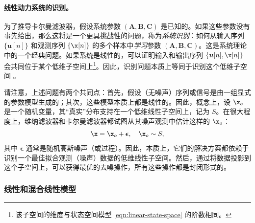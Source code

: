 \documentclass[../../book-main.tex]{subfiles}
\begin{document}
\paragraph{线性动力系统的识别。}
为了推导卡尔曼滤波器，假设系统参数 $(\boldsymbol{A}, \boldsymbol{B}, \boldsymbol{C})$ 是已知的。如果这些参数没有事先给出，那么这将是一个更具挑战性的问题，称为{\em 系统识别}：如何从输入序列 $\{\boldsymbol{u}[n]\}$ 和观测序列 $\{\x[n]\}$ 的多个样本中{\em 学习}参数 $(\boldsymbol{A}, \boldsymbol{B}, \boldsymbol{C})$。这是系统理论中的一个经典问题。如果系统是线性的，可以证明输入和输出序列 $\{\boldsymbol{u}[n], \x[n]\}$ 会共同位于某个低维子空间上\footnote{该子空间的维度与状态空间模型 \eqref{eqn:linear-state-space} 的阶数相同。}。因此，识别问题本质上等同于识别这个低维子空间 \cite{OverscheeP1996,Liu-2009-CDC,Liu-2010-SIAM}。

请注意，上述问题有两个共同点：首先，假设（无噪声）序列或信号是由一组显式的参数模型生成的；其次，这些模型本质上都是线性的。因此，概念上，设 $\x_o$ 是一个随机变量，其“真实”分布支持在一个低维线性子空间上，记为 $S$。在很大程度上，维纳滤波器和卡尔曼滤波器都试图从其噪声观测中估计这样的 $\x_o$：
\begin{equation}
    \x = \x_o + \boldsymbol{\epsilon}, \quad \x_o \sim S, 
\end{equation}
其中 $\boldsymbol{\epsilon}$ 通常是随机高斯噪声（或过程）。因此，本质上，它们的解决方案都依赖于识别一个最佳拟合观测（噪声）数据的低维线性子空间。然后，通过将数据投影到这个子空间上，可以获得最优的去噪操作，所有这些操作都是封闭形式的。


\subsubsection{线性和混合线性模型}
\label{sec:PCA-ICA}
\end{document}
